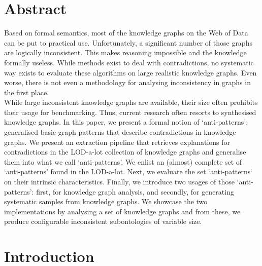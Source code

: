 \documentclass[11pt,letterpaper ,oneside ]{book}
\begin{document}
	
	\newpage
	\chapter*{Abstract}
	Based on formal semantics, most of the knowledge graphs on the Web of Data can be put to practical use. Unfortunately, a significant number of those graphs are logically inconsistent. This makes reasoning impossible and the knowledge formally useless. While methods exist to deal with contradictions, no systematic way exists to evaluate these algorithms on large realistic knowledge graphs. Even worse, there is not even a methodology for analysing inconsistency in graphs in the first place. \\
	
	While large inconsistent knowledge graphs are available, their size often prohibits their usage for benchmarking. Thus, current research often resorts to synthesised knowledge graphs. In this paper, we present a formal notion of `anti-patterns'; generalised basic graph patterns that describe contradictions in knowledge graphs. We present an extraction pipeline that retrieves explanations for contradictions in the LOD-a-lot collection of knowledge graphs and generalise them into what we call `anti-patterns'. We enlist an (almost) complete set of `anti-patterns' found in the LOD-a-lot. Next, we evaluate the set `anti-patterns` on their intrinsic characteristics. Finally, we introduce two usages of those `anti-patterns': first, for knowledge graph analysis, and secondly, for generating systematic samples from knowledge graphs. We showcase the two implementations by analysing a set of knowledge graphs and from these, we produce configurable inconsistent subontologies of variable size. 
	
	\newpage
	\tableofcontents
	\newpage
	
	\chapter{Introduction}\label{Introduction}
\end{document}
